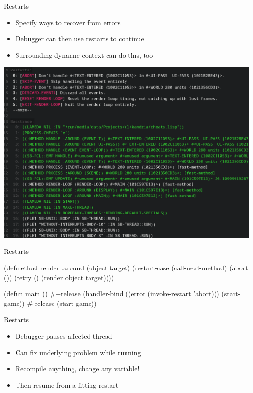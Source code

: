 \documentclass[14pt,t,aspectratio=169]{beamer}
\renewcommand{\title}[1]{
  {\huge #1} \vskip 0.4cm
}
\begin{document}
\begin{frame}
  \title{Restarts}
  \begin{itemize}
  \item Specify ways to recover from errors
  \item Debugger can then use restarts to continue
  \item Surrounding dynamic context can do this, too
  \end{itemize}
  \pause
  \vspace{0.5cm}
  \includegraphics[width=\textwidth]{debugger.png}
\end{frame}

\begin{frame}[fragile]
  \title{Restarts}
\begin{lispcode}
(defmethod render :around (object target)
  (restart-case (call-next-method)
    (abort ())
    (retry ()
      (render object target))))
\end{lispcode}
\pause\vspace{0.5cm}
\begin{lispcode}
(defun main ()
  #+release
  (handler-bind ((error (invoke-restart 'abort)))
    (start-game))
  #-release
  (start-game))
\end{lispcode}
\end{frame}

\begin{frame}[fragile]
  \title{Restarts}
  \begin{itemize}
  \item Debugger pauses affected thread
  \item Can fix underlying problem while running
  \item Recompile anything, change any variable!
  \item Then resume from a fitting restart
  \end{itemize}
\end{frame}
\end{document}
